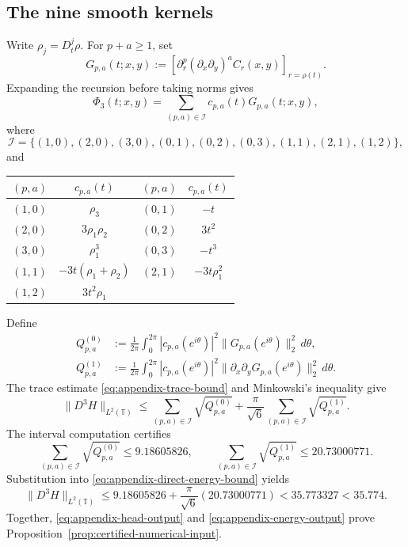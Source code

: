 \subsection{The nine smooth kernels}
\label{app:certification-nine-kernels}

Write $\rho_j=D_t^j\rho$.  For $p+a\ge1$, set
\[
  G_{p,a}(t;x,y)
  :=\left[
  \partial_r^p(\partial_x\partial_y)^aC_r(x,y)
  \right]_{r=\rho(t)}.
\]
Expanding the recursion before taking norms gives
\[
  \Phi_3(t;x,y)
  =\sum_{(p,a)\in\mathcal I}c_{p,a}(t)G_{p,a}(t;x,y),
\]
where
\[
  \mathcal I=
  \{(1,0),(2,0),(3,0),(0,1),(0,2),(0,3),
    (1,1),(2,1),(1,2)\},
\]
and
\begin{center}
\begin{tabular}{c c@{\qquad}c c}
\toprule
$(p,a)$ & $c_{p,a}(t)$ & $(p,a)$ & $c_{p,a}(t)$\\
\midrule
$(1,0)$ & $\rho_3$ & $(0,1)$ & $-t$\\
$(2,0)$ & $3\rho_1\rho_2$ & $(0,2)$ & $3t^2$\\
$(3,0)$ & $\rho_1^3$ & $(0,3)$ & $-t^3$\\
$(1,1)$ & $-3t(\rho_1+\rho_2)$ & $(2,1)$ & $-3t\rho_1^2$\\
$(1,2)$ & $3t^2\rho_1$ & & \\
\bottomrule
\end{tabular}
\end{center}

Define
\begin{align*}
  Q^{(0)}_{p,a}
  &:=\frac{1}{2\pi}\int_0^{2\pi}
  |c_{p,a}(e^{i\theta})|^2
  \|G_{p,a}(e^{i\theta})\|_2^2\,d\theta,\\
  Q^{(1)}_{p,a}
  &:=\frac{1}{2\pi}\int_0^{2\pi}
  |c_{p,a}(e^{i\theta})|^2
  \|\partial_x\partial_yG_{p,a}(e^{i\theta})\|_2^2\,d\theta.
\end{align*}
The trace estimate \eqref{eq:appendix-trace-bound} and Minkowski's inequality
give
\begin{equation}
  \|D^3H\|_{L^2(\mathbb T)}
  \le
  \sum_{(p,a)\in\mathcal I}\sqrt{Q^{(0)}_{p,a}}
  +\frac{\pi}{\sqrt6}
  \sum_{(p,a)\in\mathcal I}\sqrt{Q^{(1)}_{p,a}}.
  \label{eq:appendix-direct-energy-bound}
\end{equation}
The interval computation certifies
\[
  \sum_{(p,a)\in\mathcal I}\sqrt{Q^{(0)}_{p,a}}
  \le9.18605826,
  \qquad
  \sum_{(p,a)\in\mathcal I}\sqrt{Q^{(1)}_{p,a}}
  \le20.73000771.
\]
Substitution into \eqref{eq:appendix-direct-energy-bound} yields
\begin{equation}
  \|D^3H\|_{L^2(\mathbb T)}
  \le9.18605826+\frac{\pi}{\sqrt6}(20.73000771)
  <35.773327<35.774.
  \label{eq:appendix-energy-output}
\end{equation}
Together, \eqref{eq:appendix-head-output} and
\eqref{eq:appendix-energy-output} prove
Proposition~\ref{prop:certified-numerical-input}.


